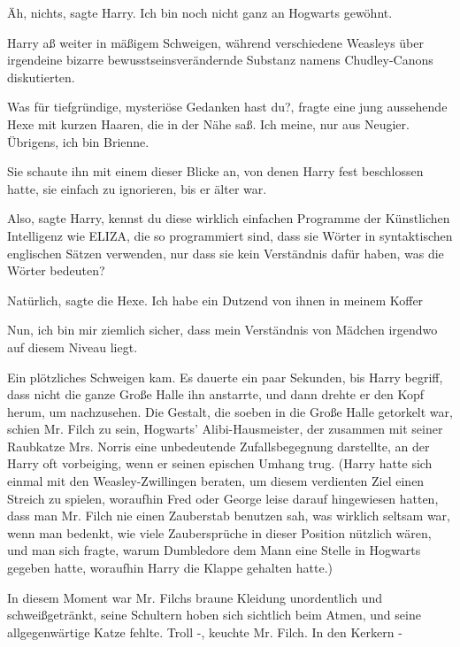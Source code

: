 \glqq Äh, nichts\grqq{}, sagte Harry. \glqq Ich bin noch nicht ganz an Hogwarts
gewöhnt.\grqq{}

Harry aß weiter in mäßigem Schweigen, während verschiedene Weasleys über
irgendeine bizarre bewusstseinsverändernde Substanz namens Chudley-Canons
diskutierten.

\glqq Was für tiefgründige, mysteriöse Gedanken hast du?\grqq{}, fragte eine
jung aussehende Hexe mit kurzen Haaren, die in der Nähe saß. \glqq Ich meine,
nur aus Neugier. Übrigens, ich bin Brienne.\grqq{}

Sie schaute ihn mit einem dieser Blicke an, von denen Harry fest beschlossen
hatte, sie einfach zu ignorieren, bis er älter war.

\glqq Also\grqq{}, sagte Harry, \glqq kennst du diese wirklich einfachen
Programme der Künstlichen Intelligenz wie ELIZA, die so programmiert sind, dass
sie Wörter in syntaktischen englischen Sätzen verwenden, nur dass sie kein
Verständnis dafür haben, was die Wörter bedeuten?\grqq{}

\glqq Natürlich\grqq{}, sagte die Hexe. \glqq Ich habe ein Dutzend von ihnen in
meinem Koffer\grqq{}

\glqq Nun, ich bin mir ziemlich sicher, dass mein Verständnis von Mädchen
irgendwo auf diesem Niveau liegt.\grqq{}

Ein plötzliches Schweigen kam. Es dauerte ein paar Sekunden, bis Harry begriff,
dass nicht die ganze Große Halle ihn anstarrte, und dann drehte er den Kopf
herum, um nachzusehen. Die Gestalt, die soeben in die Große Halle getorkelt war,
schien Mr. Filch zu sein, Hogwarts' Alibi-Hausmeister, der zusammen mit seiner
Raubkatze Mrs. Norris eine unbedeutende Zufallsbegegnung darstellte, an der
Harry oft vorbeiging, wenn er seinen epischen Umhang trug. (Harry hatte sich
einmal mit den Weasley-Zwillingen beraten, um diesem verdienten Ziel einen
Streich zu spielen, woraufhin Fred oder George leise darauf hingewiesen hatten,
dass man Mr. Filch nie einen Zauberstab benutzen sah, was wirklich seltsam war,
wenn man bedenkt, wie viele Zaubersprüche in dieser Position nützlich wären, und
man sich fragte, warum Dumbledore dem Mann eine Stelle in Hogwarts gegeben
hatte, woraufhin Harry die Klappe gehalten hatte.)

In diesem Moment war Mr. Filchs braune Kleidung unordentlich und
schweißgetränkt, seine Schultern hoben sich sichtlich beim Atmen, und seine
allgegenwärtige Katze fehlte. \glqq Troll -\grqq{}, keuchte Mr. Filch. \glqq In
den Kerkern -\grqq{}

